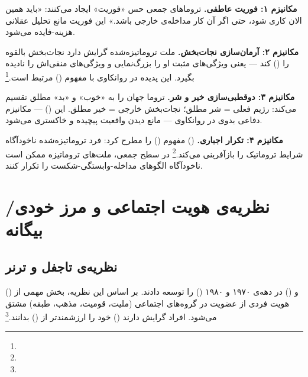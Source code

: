 \begin{tcolorbox}[casebox, title={تحلیل: تروما و نجات‌طلبی — چهار مکانیزم}]
\textbf{مکانیزم ۱: فوریت عاطفی.}
تروماهای جمعی حس «فوریت» ایجاد می‌کنند: «باید همین الان کاری شود، حتی اگر آن کار مداخله‌ی خارجی باشد.» این فوریت مانع تحلیل عقلانی هزینه-فایده می‌شود.

\textbf{مکانیزم ۲: آرمان‌سازی نجات‌بخش.}
ملت تروماتیزه‌شده گرایش دارد نجات‌بخش بالقوه را  () کند — یعنی ویژگی‌های مثبت او را بزرگ‌نمایی و ویژگی‌های منفی‌اش را نادیده بگیرد. این پدیده در روانکاوی با مفهوم  () مرتبط است.\footnote{}

\textbf{مکانیزم ۳: دوقطبی‌سازی خیر و شر.}
تروما جهان را به «خوب» و «بد» مطلق تقسیم می‌کند: رژیم فعلی = شر مطلق؛ نجات‌بخش خارجی = خیر مطلق. این  () — مکانیزم دفاعی بدوی در روانکاوی — مانع دیدن واقعیت پیچیده و خاکستری می‌شود.

\textbf{مکانیزم ۴: تکرار اجباری.}
 () مفهوم  () را مطرح کرد: فرد تروماتیزه‌شده ناخودآگاه شرایط تروماتیک را بازآفرینی می‌کند.\footnote{} در سطح جمعی، ملت‌های تروماتیزه ممکن است ناخودآگاه الگوهای مداخله-وابستگی-شکست را تکرار کنند.
\end{tcolorbox}


\section{نظریه‌ی هویت اجتماعی و مرز خودی/بیگانه}
\label{sec:ch11-social-identity}

\subsection{نظریه‌ی تاجفل و ترنر}
\label{subsec:ch11-tajfel-turner}

 () و  () در دهه‌ی ۱۹۷۰ و ۱۹۸۰  () را توسعه دادند. بر اساس این نظریه، بخش مهمی از هویت فردی از عضویت در گروه‌های اجتماعی (ملیت، قومیت، مذهب، طبقه) مشتق می‌شود. افراد گرایش دارند  () خود را ارزشمندتر از  () بدانند.\footnote{}

